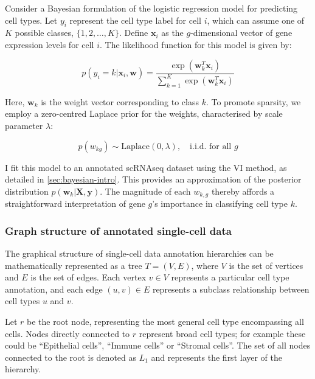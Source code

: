 Consider a Bayesian formulation of the logistic regression model for predicting cell types. Let $y_i$ represent the cell type label for cell $i$, which can assume one of $K$ possible classes, $\{1, 2, \ldots, K\}$. Define $\mathbf{x}_i$ as the $g$-dimensional vector of gene expression levels for cell $i$. The likelihood function for this model is given by:

\begin{equation}
    \label{eq:logistic-regression-likelihood}
    p(y_i = k | \mathbf{x}_i, \mathbf{w}) = \frac{\exp(\mathbf{w}_{k}^T \mathbf{x}_i)}{\sum_{k=1}^{K} \exp(\mathbf{w}_{k}^T \mathbf{x}_i)}
\end{equation}

Here, $\mathbf{w}_k$ is the weight vector corresponding to class $k$. To promote sparsity, we employ a zero-centred Laplace prior for the weights, characterised by scale parameter $\lambda$:

\begin{equation}
    \label{eq:logistic-regression-prior}
    p(w_{kg}) \sim \text{Laplace}(0, \lambda),\quad\text{i.i.d. for all } g 
\end{equation}

I fit this model to an annotated \ac{scRNAseq} dataset using the \ac{VI} method, as detailed in \cref{sec:bayesian-intro}. This provides an approximation of the posterior distribution $p(\mathbf{w}_k | \mathbf{X}, \mathbf{y})$. The magnitude of each $w_{k,g}$ thereby affords a straightforward interpretation of gene $g$'s importance in classifying cell type $k$.

\subsubsection*{Graph structure of annotated single-cell data}

The graphical structure of single-cell data annotation hierarchies can be mathematically represented as a tree $T = (V, E)$, where $V$ is the set of vertices and $E$ is the set of edges. Each vertex $v \in V$ represents a particular cell type annotation, and each edge $(u, v) \in E$ represents a subclass relationship between cell types $u$ and $v$. 

Let $r$ be the root node, representing the most general cell type encompassing all cells. Nodes directly connected to $r$ represent broad cell types; for example these could be ``Epithelial cells'', ``Immune cells'' or ``Stromal cells''. The set of all nodes connected to the root is denoted as $L_1$ and represents the first layer of the hierarchy. 

